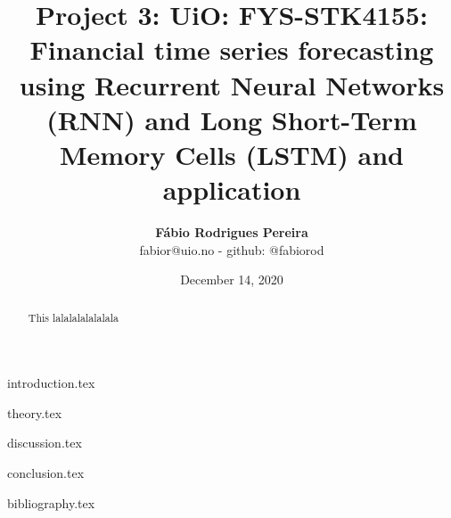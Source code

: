 \documentclass{article}
\title{Project 3: UiO: FYS-STK4155: Financial time series forecasting using Recurrent Neural Networks (RNN) and Long Short-Term Memory Cells (LSTM) and application}
\author{\textbf{Fábio Rodrigues Pereira} \\ \small fabior@uio.no - github: @fabiorod}
\date{December 14, 2020}
\begin{document}
\maketitle
\begin{abstract}
\noindent This lalalalalalalala
\end{abstract}

\bigskip

\tableofcontents

\clearpage
\thispagestyle{empty}

{introduction.tex}

\clearpage
\thispagestyle{empty}

{theory.tex}

\clearpage
\thispagestyle{empty}

{discussion.tex}

\clearpage
\thispagestyle{empty}

{conclusion.tex}

\clearpage
\thispagestyle{empty}

{bibliography.tex}
\end{document}

